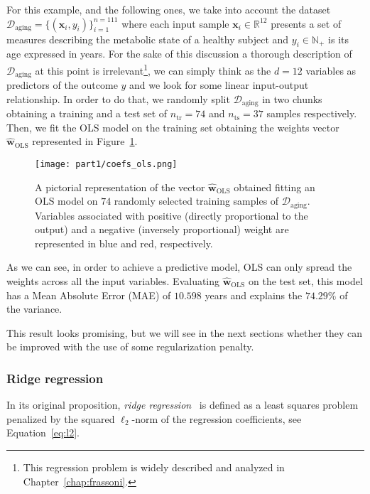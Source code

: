 			For this example, and the following ones, we take into account the dataset $\mathcal{D}_{\text{aging}} = \{(\bm{x}_i, y_i)\}_{i=1}^{n=111}$ where each input sample $\bm{x}_i \in \mathbb{R}^{12}$ presents a set of measures describing the metabolic state of a healthy subject and $y_i \in \mathbb{N}_+$ is its age expressed in years.
			For the sake of this discussion a  thorough description of $\mathcal{D}_{\text{aging}}$ at this point is irrelevant\footnote{ This regression problem is widely described and analyzed in Chapter~\ref{chap:frassoni}.}, we can simply think as the $d=12$ variables as predictors of the outcome $y$ and we look for some linear input-output relationship.
			In order to do that, we randomly split $\mathcal{D}_{\text{aging}}$ in two chunks obtaining a training and a test set of $n_{\text{tr}}=74$ and $n_{\text{ts}}=37$ samples respectively. Then, we fit the OLS model on the training set obtaining the weights vector $\bm{\hat w}_{\text{OLS}}$ represented in Figure~\ref{fig:coefs_ols}.
			\begin{figure}[!h]
				\centering
				\texttt{[image: part1/coefs\_ols.png]}
				\caption{A pictorial representation of the vector $\bm{\hat w}_{\text{OLS}}$ obtained fitting an OLS model on $74$ randomly selected training samples of $\mathcal{D}_{\text{aging}}$. Variables associated with positive (\ie directly proportional to the output) and a negative (\ie inversely proportional) weight are represented in blue and red, respectively.} \label{fig:coefs_ols}
		  \end{figure}
			As we can see, in order to achieve a predictive model, OLS can only spread the weights across all the input variables. Evaluating $\bm{\hat w}_{\text{OLS}}$ on the test set, this model has a Mean Absolute Error (\ac{MAE}) of $10.598$ years and explains the $74.29\%$ of the variance.

			This result looks promising, but we will see in the next sections whether they can be improved with the use of some regularization penalty.


			\subsubsection{Ridge regression} \label{sec:ridge_regression}
			In its original proposition, \textit{ridge regression}~\cite{hoerl1970ridge} is defined as a least squares problem penalized by the squared $\ell_2$-norm of the regression coefficients, see Equation~\eqref{eq:l2}.


